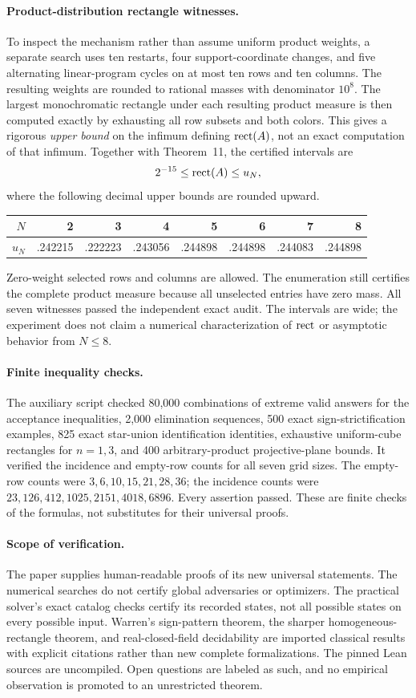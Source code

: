 \paragraph{Product-distribution rectangle witnesses.}
To inspect the mechanism rather than assume uniform product weights, a separate search uses ten restarts, four support-coordinate changes, and five alternating linear-program cycles on at most ten rows and ten columns. The resulting weights are rounded to rational masses with denominator $10^8$. The largest monochromatic rectangle under each resulting product measure is then computed exactly by exhausting all row subsets and both colors. This gives a rigorous \emph{upper bound} on the infimum defining $\operatorname{rect}(A)$, not an exact computation of that infimum. Together with Theorem~11, the certified intervals are
\[
 2^{-15}\le\operatorname{rect}(A)\le u_N,
\]
where the following decimal upper bounds are rounded upward.
\begin{center}
\begin{tabular}{rrrrrrrr}
\toprule
$N$&2&3&4&5&6&7&8\\
\midrule
$u_N$&.242215&.222223&.243056&.244898&.244898&.244083&.244898\\
\bottomrule
\end{tabular}
\end{center}
Zero-weight selected rows and columns are allowed. The enumeration still certifies the complete product measure because all unselected entries have zero mass. All seven witnesses passed the independent exact audit. The intervals are wide; the experiment does not claim a numerical characterization of $\operatorname{rect}$ or asymptotic behavior from $N\le8$.

\paragraph{Finite inequality checks.}
The auxiliary script checked 80,000 combinations of extreme valid answers for the acceptance inequalities, 2,000 elimination sequences, 500 exact sign-strictification examples, 825 exact star-union identification identities, exhaustive uniform-cube rectangles for $n=1,3$, and 400 arbitrary-product projective-plane bounds. It verified the incidence and empty-row counts for all seven grid sizes. The empty-row counts were $3,6,10,15,21,28,36$; the incidence counts were $23,126,412,1025,2151,4018,6896$. Every assertion passed. These are finite checks of the formulas, not substitutes for their universal proofs.

\paragraph{Scope of verification.}
The paper supplies human-readable proofs of its new universal statements. The numerical searches do not certify global adversaries or optimizers. The practical solver's exact catalog checks certify its recorded states, not all possible states on every possible input. Warren's sign-pattern theorem, the sharper homogeneous-rectangle theorem, and real-closed-field decidability are imported classical results with explicit citations rather than new complete formalizations. The pinned Lean sources are uncompiled. Open questions are labeled as such, and no empirical observation is promoted to an unrestricted theorem.
